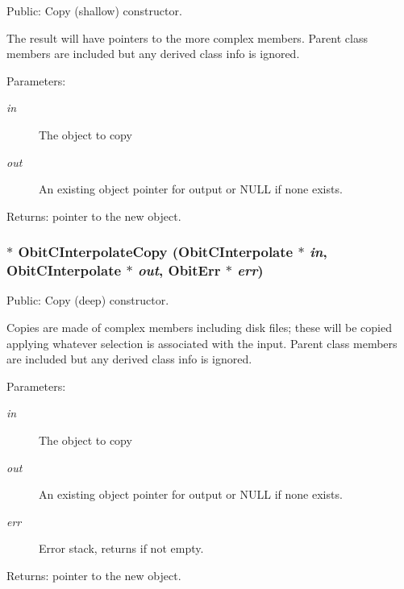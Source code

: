 Public: Copy (shallow) constructor. 

The result will have pointers to the more complex members. Parent class members are included but any derived class info is ignored. \begin{Desc}
\item[Parameters:]
\begin{description}
\item[{\em in}]The object to copy \item[{\em out}]An existing object pointer for output or NULL if none exists. \end{description}
\end{Desc}
\begin{Desc}
\item[Returns:]pointer to the new object. \end{Desc}
\subsubsection{$\ast$ Obit\-CInterpolate\-Copy ({\bf Obit\-CInterpolate} $\ast$ {\em in}, {\bf Obit\-CInterpolate} $\ast$ {\em out}, {\bf Obit\-Err} $\ast$ {\em err})}\label{ObitCInterpolate_8c_a12}


Public: Copy (deep) constructor. 

Copies are made of complex members including disk files; these will be copied applying whatever selection is associated with the input. Parent class members are included but any derived class info is ignored. \begin{Desc}
\item[Parameters:]
\begin{description}
\item[{\em in}]The object to copy \item[{\em out}]An existing object pointer for output or NULL if none exists. \item[{\em err}]Error stack, returns if not empty. \end{description}
\end{Desc}
\begin{Desc}
\item[Returns:]pointer to the new object. \end{Desc}

